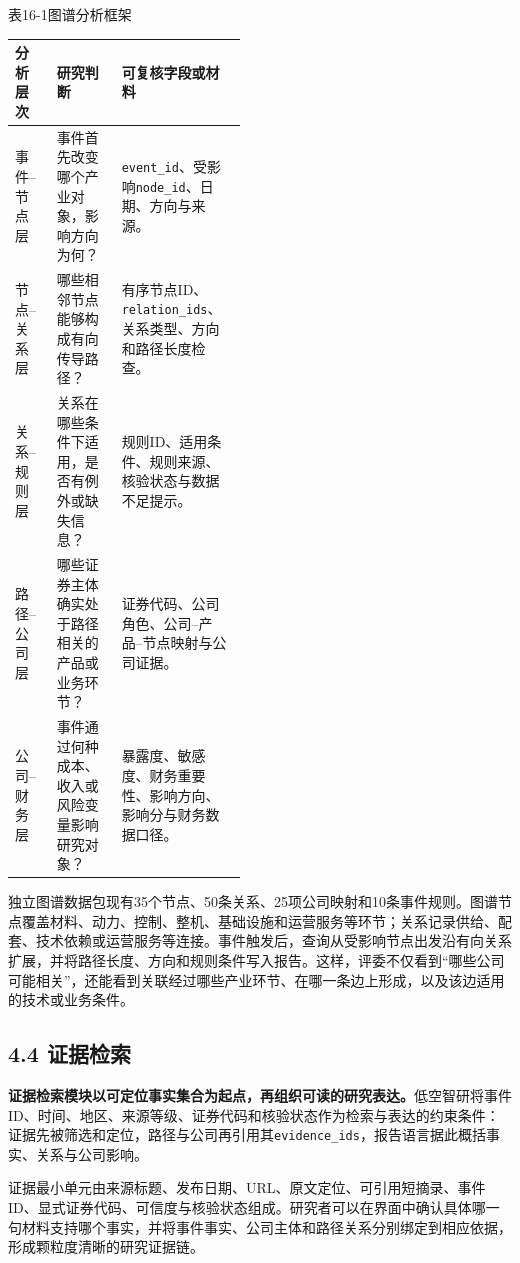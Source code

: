 \begin{center}\small 表16-1\quad 图谱分析框架\par\vspace{1mm}
\begin{tabularx}{\linewidth}{p{0.18\linewidth}p{0.28\linewidth}X}
\toprule
分析层次 & 研究判断 & 可复核字段或材料\\
\midrule
事件--节点层 & 事件首先改变哪个产业对象，影响方向为何？ & \texttt{event\_id}、受影响\texttt{node\_id}、日期、方向与来源。\\
节点--关系层 & 哪些相邻节点能够构成有向传导路径？ & 有序节点ID、\texttt{relation\_ids}、关系类型、方向和路径长度检查。\\
关系--规则层 & 关系在哪些条件下适用，是否有例外或缺失信息？ & 规则ID、适用条件、规则来源、核验状态与数据不足提示。\\
路径--公司层 & 哪些证券主体确实处于路径相关的产品或业务环节？ & 证券代码、公司角色、公司--产品--节点映射与公司证据。\\
公司--财务层 & 事件通过何种成本、收入或风险变量影响研究对象？ & 暴露度、敏感度、财务重要性、影响方向、影响分与财务数据口径。\\
\bottomrule
\end{tabularx}\end{center}

独立图谱数据包现有35个节点、50条关系、25项公司映射和10条事件规则\cite{lhy-graph}。图谱节点覆盖材料、动力、控制、整机、基础设施和运营服务等环节；关系记录供给、配套、技术依赖或运营服务等连接。事件触发后，查询从受影响节点出发沿有向关系扩展，并将路径长度、方向和规则条件写入报告。这样，评委不仅看到“哪些公司可能相关”，还能看到关联经过哪些产业环节、在哪一条边上形成，以及该边适用的技术或业务条件。


\subsection*{4.4 证据检索}\label{page:17}
\noindent\textbf{证据检索模块以可定位事实集合为起点，再组织可读的研究表达。}低空智研将事件ID、时间、地区、来源等级、证券代码和核验状态作为检索与表达的约束条件：证据先被筛选和定位，路径与公司再引用其\texttt{evidence\_ids}，报告语言据此概括事实、关系与公司影响\cite{lhy-evidence,lhy-contracts}。

证据最小单元由来源标题、发布日期、URL、原文定位、可引用短摘录、事件ID、显式证券代码、可信度与核验状态组成。研究者可以在界面中确认具体哪一句材料支持哪个事实，并将事件事实、公司主体和路径关系分别绑定到相应依据，形成颗粒度清晰的研究证据链。

